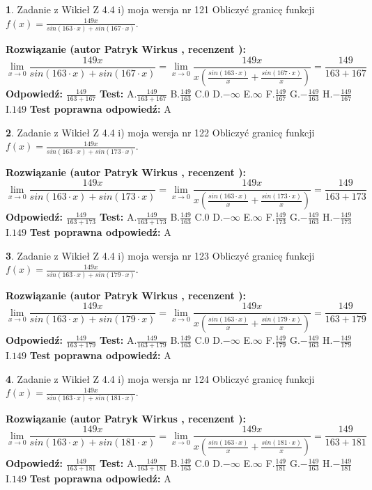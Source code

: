 \documentclass[12pt, a4paper]{article}
\theoremstyle{definition} %
\newtheorem{zad}{}
\newcommand{\zadStart}[1]{\begin{zad}#1\newline}
\newcommand{\zadStop}{\end{zad}}
\newcommand{\rozwStart}[2]{\noindent \textbf{Rozwiązanie (autor #1 , recenzent #2): }\newline}
\newcommand{\rozwStop}{\newline}
\newcommand{\odpStart}{\noindent \textbf{Odpowiedź:}\newline}
\newcommand{\odpStop}{\newline}
\newcommand{\testStart}{\noindent \textbf{Test:}\newline}
\newcommand{\testStop}{\newline}
\newcommand{\kluczStart}{\noindent \textbf{Test poprawna odpowiedź:}\newline}
\newcommand{\kluczStop}{\newline}
\begin{document}
\zadStart{Zadanie z Wikieł Z 4.4 i) moja wersja nr 121}
Obliczyć granicę funkcji $f(x)=\frac{149x}{sin(163\cdot x) +sin(167\cdot x)}$.
\zadStop
\rozwStart{Patryk Wirkus}{}
$$\lim\limits_{x\to 0}\frac{149x}{sin(163\cdot x) +sin(167\cdot x)}=\lim\limits_{x\to 0}\frac{149x}{x(\frac{sin(163\cdot x)}{x}+\frac{sin(167\cdot x)}{x})}=\frac{149}{163+167}$$
\rozwStop
\odpStart
$\frac{149}{163+167}$
\odpStop
\testStart
A.$\frac{149}{163+167}$
B.$\frac{149}{163}$
C.$0$
D.$-\infty$
E.$\infty$
F.$\frac{149}{167}$
G.$-\frac{149}{163}$
H.$-\frac{149}{167}$
I.$149$
\testStop
\kluczStart
A
\kluczStop



\zadStart{Zadanie z Wikieł Z 4.4 i) moja wersja nr 122}
Obliczyć granicę funkcji $f(x)=\frac{149x}{sin(163\cdot x) +sin(173\cdot x)}$.
\zadStop
\rozwStart{Patryk Wirkus}{}
$$\lim\limits_{x\to 0}\frac{149x}{sin(163\cdot x) +sin(173\cdot x)}=\lim\limits_{x\to 0}\frac{149x}{x(\frac{sin(163\cdot x)}{x}+\frac{sin(173\cdot x)}{x})}=\frac{149}{163+173}$$
\rozwStop
\odpStart
$\frac{149}{163+173}$
\odpStop
\testStart
A.$\frac{149}{163+173}$
B.$\frac{149}{163}$
C.$0$
D.$-\infty$
E.$\infty$
F.$\frac{149}{173}$
G.$-\frac{149}{163}$
H.$-\frac{149}{173}$
I.$149$
\testStop
\kluczStart
A
\kluczStop



\zadStart{Zadanie z Wikieł Z 4.4 i) moja wersja nr 123}
Obliczyć granicę funkcji $f(x)=\frac{149x}{sin(163\cdot x) +sin(179\cdot x)}$.
\zadStop
\rozwStart{Patryk Wirkus}{}
$$\lim\limits_{x\to 0}\frac{149x}{sin(163\cdot x) +sin(179\cdot x)}=\lim\limits_{x\to 0}\frac{149x}{x(\frac{sin(163\cdot x)}{x}+\frac{sin(179\cdot x)}{x})}=\frac{149}{163+179}$$
\rozwStop
\odpStart
$\frac{149}{163+179}$
\odpStop
\testStart
A.$\frac{149}{163+179}$
B.$\frac{149}{163}$
C.$0$
D.$-\infty$
E.$\infty$
F.$\frac{149}{179}$
G.$-\frac{149}{163}$
H.$-\frac{149}{179}$
I.$149$
\testStop
\kluczStart
A
\kluczStop



\zadStart{Zadanie z Wikieł Z 4.4 i) moja wersja nr 124}
Obliczyć granicę funkcji $f(x)=\frac{149x}{sin(163\cdot x) +sin(181\cdot x)}$.
\zadStop
\rozwStart{Patryk Wirkus}{}
$$\lim\limits_{x\to 0}\frac{149x}{sin(163\cdot x) +sin(181\cdot x)}=\lim\limits_{x\to 0}\frac{149x}{x(\frac{sin(163\cdot x)}{x}+\frac{sin(181\cdot x)}{x})}=\frac{149}{163+181}$$
\rozwStop
\odpStart
$\frac{149}{163+181}$
\odpStop
\testStart
A.$\frac{149}{163+181}$
B.$\frac{149}{163}$
C.$0$
D.$-\infty$
E.$\infty$
F.$\frac{149}{181}$
G.$-\frac{149}{163}$
H.$-\frac{149}{181}$
I.$149$
\testStop
\kluczStart
A
\kluczStop
\end{document}
